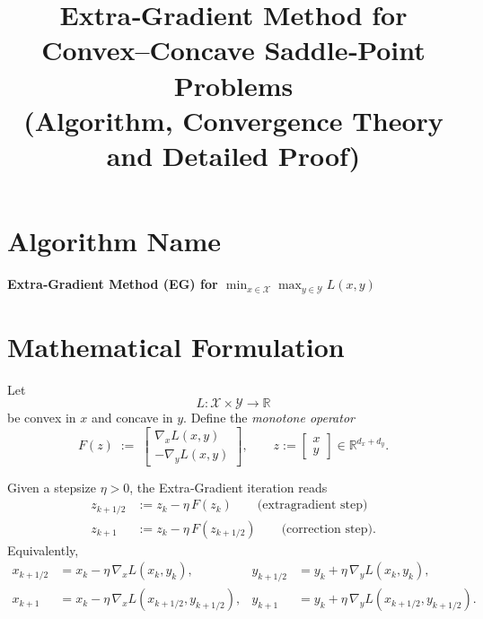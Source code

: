 \documentclass[11pt]{article}
\begin{document}
\title{Extra‑Gradient Method for Convex–Concave Saddle‑Point Problems\\
(Algorithm, Convergence Theory and Detailed Proof)}
\author{}
\date{}
\maketitle

\section*{Algorithm Name}
\textbf{Extra‑Gradient Method (EG) for $\displaystyle\min_{x\in\mathcal X}\max_{y\in\mathcal Y}L(x,y)$}
\bigskip

\section*{Mathematical Formulation}
Let 
\[
L:\mathcal X\times\mathcal Y\to\mathbb R
\]
be convex in $x$ and concave in $y$.  Define the \emph{monotone operator}
\[
F(z)\;:=\;
\begin{bmatrix}
\nabla_{x}L(x,y)\\[2mm]
-\nabla_{y}L(x,y)
\end{bmatrix},
\qquad 
z:=\begin{bmatrix}x\\y\end{bmatrix}\in\mathbb R^{d_x+d_y}.
\]

Given a stepsize $\eta>0$, the Extra‑Gradient iteration reads
\[
\boxed{
\begin{aligned}
z_{k+1/2}&:=z_{k}-\eta\,F(z_{k}) \qquad\text{(extragradient step)}\\[1mm]
z_{k+1}&:=z_{k}-\eta\,F(z_{k+1/2}) \qquad\text{(correction step)} .
\end{aligned}}
\]
Equivalently,
\[
\begin{aligned}
x_{k+1/2}&=x_k-\eta\,\nabla_x L(x_k,y_k), &
y_{k+1/2}&=y_k+\eta\,\nabla_y L(x_k,y_k),\\[1mm]
x_{k+1}&=x_k-\eta\,\nabla_x L(x_{k+1/2},y_{k+1/2}), &
y_{k+1}&=y_k+\eta\,\nabla_y L(x_{k+1/2},y_{k+1/2}).
\end{aligned}
\]

\bigskip

\end{document}
